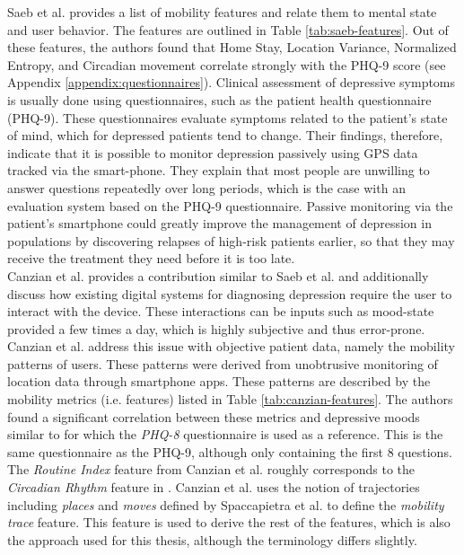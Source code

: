 Saeb et al. provides a list of mobility features and relate them to mental state and user behavior. The features are outlined in Table \ref{tab:saeb-features}. Out of these features, the authors found that Home Stay, Location Variance, Normalized Entropy, and Circadian movement correlate strongly with the PHQ-9 score (see Appendix \ref{appendix:questionnaires}). Clinical assessment of depressive symptoms is usually done using questionnaires, such as the patient health questionnaire (PHQ-9). These questionnaires evaluate symptoms related to the patient's state of mind, which for depressed patients tend to change. Their findings, therefore, indicate that it is possible to monitor depression passively using GPS data tracked via the smart-phone. They explain that most people are unwilling to answer questions repeatedly over long periods, which is the case with an evaluation system based on the PHQ-9 questionnaire. Passive monitoring via the patient's smartphone could greatly improve the management of depression in populations by discovering relapses of high-risk patients earlier, so that they may receive the treatment they need before it is too late. \\



Canzian et al. provides a contribution similar to Saeb et al. and additionally discuss how existing digital systems for diagnosing depression require the user to interact with the device. These interactions can be inputs such as mood-state provided a few times a day, which is highly subjective and thus error-prone. Canzian et al. address this issue with objective patient data, namely the mobility patterns of users. These patterns were derived from unobtrusive monitoring of location data through smartphone apps. These patterns are described by the mobility metrics (i.e. features) listed in Table \ref{tab:canzian-features}. The authors found a significant correlation between these metrics and depressive moods similar to \cite{Saeb2015} for which the \textit{PHQ-8} questionnaire is used as a reference. This is the same questionnaire as the PHQ-9, although only containing the first 8 questions. The \textit{Routine Index} feature from Canzian et al. roughly corresponds to the \textit{Circadian Rhythm} feature in \cite{Saeb2015}. Canzian et al. \cite{Canzian2015} uses the notion of trajectories including \textit{places} and \textit{moves} defined by Spaccapietra et al. \cite{trajectories2008} to define the \textit{mobility trace} feature. This feature is used to derive the rest of the features, which is also the approach used for this thesis, although the terminology differs slightly.\\

